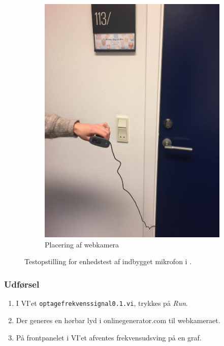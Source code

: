 \begin{figure}
\begin{subfigure}[b]{0.4\textwidth}
			\includegraphics[width=\textwidth]{webcam1}
			\caption{Placering af webkamera}
			\label{fig:webop2}
			\end{subfigure}	
		\caption{Testopstilling for enhedstest af indbygget mikrofon i \webcammic.}	
		\label{fig:webop}
		\end{figure}
	
		\subsubsection{Udførsel}
			\begin{enumerate}
				\item I VI'et \texttt{optagefrekvenssignal0.1.vi}, trykkes på \textit{Run}.  
				\item Der generes en hørbar lyd i onlinegenerator.com til webkameraet.
				\item På frontpanelet i VI'et afventes frekvensudsving på en graf. 
			\end{enumerate}
		
